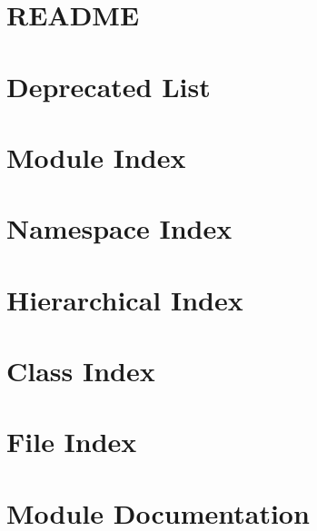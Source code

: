 \let\mypdfximage\pdfximage\def\pdfximage{\immediate\mypdfximage}\documentclass[twoside]{book}
\newcommand{\+}{\discretionary{\mbox{\scriptsize$\hookleftarrow$}}{}{}}
\begin{document}
\chapter{R\+E\+A\+D\+ME}
\label{md__c_1__users__riley__nolan__desktop__school__spring_2019__c_s4850_git_finalproject-bluesentinel__project__r_e_a_d_m_e}

\chapter{Deprecated List}
\label{deprecated}

\chapter{Module Index}

\chapter{Namespace Index}

\chapter{Hierarchical Index}

\chapter{Class Index}

\chapter{File Index}

\chapter{Module Documentation}



\end{document}
